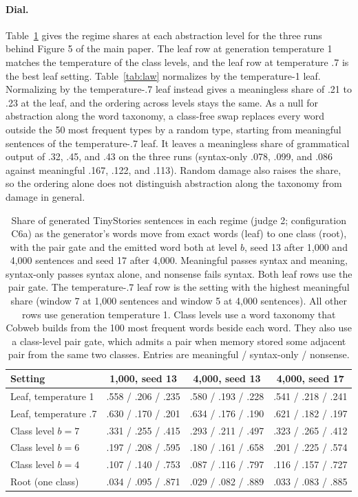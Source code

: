 \documentclass[11pt,letterpaper]{article}
\begin{document}
\paragraph{Dial.} Table~\ref{tab:dial} gives the regime shares at each abstraction level for the three runs behind Figure 5 of the main paper.
The leaf row at generation temperature 1 matches the temperature of the class levels, and the leaf row at temperature .7 is the best leaf setting.
Table~\ref{tab:law} normalizes by the temperature-1 leaf. Normalizing by the temperature-.7 leaf instead gives a meaningless share of .21 to .23 at the leaf, and the ordering across levels stays the same.
As a null for abstraction along the word taxonomy, a class-free swap replaces every word outside the 50 most frequent types by a random type, starting from meaningful sentences of the temperature-.7 leaf.
It leaves a meaningless share of grammatical output of .32, .45, and .43 on the three runs (syntax-only .078, .099, and .086 against meaningful .167, .122, and .113). Random damage also raises the share, so the ordering alone does not distinguish abstraction along the taxonomy from damage in general.

\begin{table}[h]
\caption{Share of generated TinyStories sentences in each regime (judge 2; configuration C6a) as the generator's words move from exact words (leaf) to one class (root), with the pair gate and the emitted word both at level $b$, seed 13 after 1,000 and 4,000 sentences and seed 17 after 4,000.
Meaningful passes syntax and meaning, syntax-only passes syntax alone, and nonsense fails syntax. Both leaf rows use the pair gate. The temperature-.7 leaf row is the setting with the highest meaningful share (window 7 at 1,000 sentences and window 5 at 4,000 sentences).
All other rows use generation temperature 1. Class levels use a word taxonomy that Cobweb builds from the 100 most frequent words beside each word.
They also use a class-level pair gate, which admits a pair when memory stored some adjacent pair from the same two classes. Entries are meaningful / syntax-only / nonsense.}
\label{tab:dial}
\begin{center}
\footnotesize
\begin{tabular}{lccc}
\toprule
Setting & 1,000, seed 13 & 4,000, seed 13 & 4,000, seed 17 \\
\midrule
Leaf, temperature 1 & .558 / .206 / .235 & .580 / .193 / .228 & .541 / .218 / .241 \\
Leaf, temperature .7 & .630 / .170 / .201 & .634 / .176 / .190 & .621 / .182 / .197 \\
Class level $b=7$ & .331 / .255 / .415 & .293 / .211 / .497 & .323 / .265 / .412 \\
Class level $b=6$ & .197 / .208 / .595 & .180 / .161 / .658 & .201 / .225 / .574 \\
Class level $b=4$ & .107 / .140 / .753 & .087 / .116 / .797 & .116 / .157 / .727 \\
Root (one class) & .034 / .095 / .871 & .029 / .082 / .889 & .033 / .083 / .885 \\
\bottomrule
\end{tabular}
\end{center}
\end{table}
\end{document}
